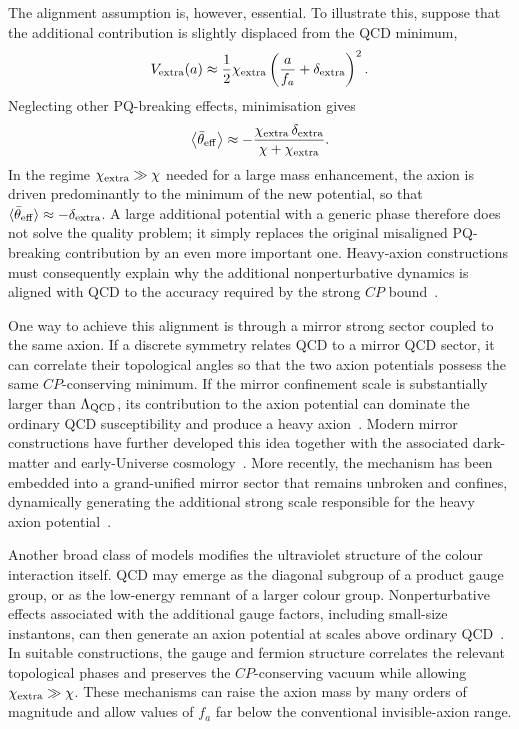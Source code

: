 \documentclass[review]{elsarticle}
\numberwithin{equation}{section}
\numberwithin{table}{section}
\numberwithin{figure}{section}
\begin{document}
The alignment assumption is, however, essential. To illustrate this, suppose that the additional contribution is slightly displaced from the QCD minimum,
\begin{align}
    V_{\rm extra}(a)
    \approx
    \frac{1}{2}\chi_{\rm extra}
    \left(\frac{a}{f_a}+\delta_{\rm extra}\right)^2 .
    \label{eq:heavy-axion-misaligned-extra-potential}
\end{align}
Neglecting other PQ-breaking effects, minimisation gives
\begin{align}
    \left\langle\bar\theta_{\rm eff}\right\rangle
    \approx
    -\frac{\chi_{\rm extra}\,\delta_{\rm extra}}{\chi+\chi_{\rm extra}}.
    \label{eq:heavy-axion-extra-phase}
\end{align}
In the regime $\chi_{\rm extra}\gg\chi$ needed for a large mass enhancement, the axion is driven predominantly to the minimum of the new potential, so that
$\langle\bar\theta_{\rm eff}\rangle\approx -\delta_{\rm extra}$. A large additional potential with a generic phase therefore does not solve the quality problem; it simply replaces the original misaligned PQ-breaking contribution by an even more important one. Heavy-axion constructions must consequently explain why the additional nonperturbative dynamics is aligned with QCD to the accuracy required by the strong $CP$ bound~\cite{Hook:2019qoh,Valenti:2022tsc}.

One way to achieve this alignment is through a mirror strong sector coupled to the same axion. If a discrete symmetry relates QCD to a mirror QCD sector, it can correlate their topological angles so that the two axion potentials possess the same $CP$-conserving minimum. If the mirror confinement scale is substantially larger than $\Lambda_{\rm QCD}$, its contribution to the axion potential can dominate the ordinary QCD susceptibility and produce a heavy axion~\cite{Berezhiani:2000gh,Fukuda:2015ana,Hook:2019qoh}. Modern mirror constructions have further developed this idea together with the associated dark-matter and early-Universe cosmology~\cite{Dunsky:2023ucb}. More recently, the mechanism has been embedded into a grand-unified mirror sector that remains unbroken and confines, dynamically generating the additional strong scale responsible for the heavy axion potential~\cite{Cacciapaglia:2026yvm}.

Another broad class of models modifies the ultraviolet structure of the colour interaction itself. QCD may emerge as the diagonal subgroup of a product gauge group, or as the low-energy remnant of a larger colour group. Nonperturbative effects associated with the additional gauge factors, including small-size instantons, can then generate an axion potential at scales above ordinary QCD~\cite{Agrawal:2017ksf,Gaillard:2018xgk,Gherghetta:2020ofz,Gherghetta:2020keg,Gupta:2020vxb,Valenti:2022tsc,Sesma:2024tcd}. In suitable constructions, the gauge and fermion structure correlates the relevant topological phases and preserves the $CP$-conserving vacuum while allowing $\chi_{\rm extra}\gg\chi$. These mechanisms can raise the axion mass by many orders of magnitude and allow values of $f_a$ far below the conventional invisible-axion range.
\end{document}
